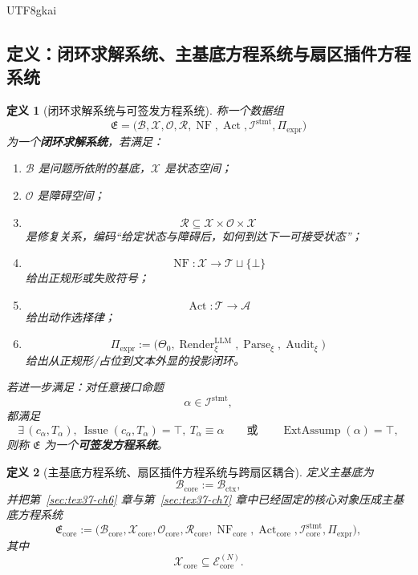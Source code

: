 \documentclass[12pt]{article}
\newtheorem{definition}{定义}[section]
\newcommand{\Parse}{\operatorname{Parse}}
\newcommand{\Audit}{\operatorname{Audit}}
\newcommand{\Issue}{\operatorname{Issue}}
\newcommand{\ExtAssump}{\operatorname{ExtAssump}}
\newcommand{\Render}{\operatorname{Render}}
\begin{document}
\begin{CJK*}{UTF8}{gkai}
\subsection{定义：闭环求解系统、主基底方程系统与扇区插件方程系统}
\label{subsec:tex37-ch11-definitions}

\begin{definition}[闭环求解系统与可签发方程系统]
\label{def:tex37-ch11-signable-system}
称一个数据组
\[
  \mathfrak E
  =
  \bigl(
    \mathcal B,
    \mathcal X,
    \mathcal O,
    \mathcal R,
    \operatorname{NF},
    \operatorname{Act},
    \mathcal I^{\mathrm{stmt}},
    \Pi_{\mathrm{expr}}
  \bigr)
\]
为一个\textbf{闭环求解系统}，若满足：
\begin{enumerate}
  \item $\mathcal B$ 是问题所依附的基底，$\mathcal X$ 是状态空间；
  \item $\mathcal O$ 是障碍空间；
  \item
  \[
    \mathcal R\subseteq \mathcal X\times \mathcal O\times \mathcal X
  \]
  是修复关系，编码“给定状态与障碍后，如何到达下一可接受状态”；
  \item
  \[
    \operatorname{NF}:\mathcal X\to \mathcal T\sqcup\{\bot\}
  \]
  给出正规形或失败符号；
  \item
  \[
    \operatorname{Act}:\mathcal T\to \mathcal A
  \]
  给出动作选择律；
  \item
  \[
    \Pi_{\mathrm{expr}}
    :=
    \bigl(
      \Theta_0,
      \Render^{\mathrm{LLM}}_\xi,
      \Parse_\xi,
      \Audit_\xi
    \bigr)
  \]
  给出从正规形/占位到文本外显的投影闭环。
\end{enumerate}

若进一步满足：对任意接口命题
\[
  \alpha\in \mathcal I^{\mathrm{stmt}},
\]
都满足
\[
  \exists\,(c_\alpha,T_\alpha),\ \Issue(c_\alpha,T_\alpha)=\top,\ T_\alpha\equiv \alpha
  \qquad\text{或}\qquad
  \ExtAssump(\alpha)=\top,
\]
则称 $\mathfrak E$ 为一个\textbf{可签发方程系统}。
\end{definition}

\begin{definition}[主基底方程系统、扇区插件方程系统与跨扇区耦合]
\label{def:tex37-ch11-core-sector}
定义主基底为
\[
  \mathcal B_{\mathrm{core}}:=\mathcal B_{\mathrm{ctx}},
\]
并把第~\ref{sec:tex37-ch6} 章与第~\ref{sec:tex37-ch7} 章中已经固定的核心对象压成主基底方程系统
\[
  \mathfrak E_{\mathrm{core}}
  :=
  \bigl(
    \mathcal B_{\mathrm{core}},
    \mathcal X_{\mathrm{core}},
    \mathcal O_{\mathrm{core}},
    \mathcal R_{\mathrm{core}},
    \operatorname{NF}_{\mathrm{core}},
    \operatorname{Act}_{\mathrm{core}},
    \mathcal I_{\mathrm{core}}^{\mathrm{stmt}},
    \Pi_{\mathrm{expr}}
  \bigr),
\]
其中
\[
  \mathcal X_{\mathrm{core}}\subseteq \mathcal E_{\mathrm{core}}^{(N)}.
\]


\end{definition}
\end{CJK*}
\end{document}
